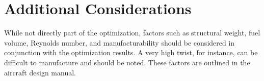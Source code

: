 \documentclass{article}
\begin{document}
\section{Additional Considerations}
While not directly part of the optimization, factors such as structural weight, fuel volume, Reynolds number, and manufacturability should be considered in conjunction with the optimization results. A very high twist, for instance, can be difficult to manufacture and should be noted. These factors are outlined in the aircraft design manual.
\end{document}
